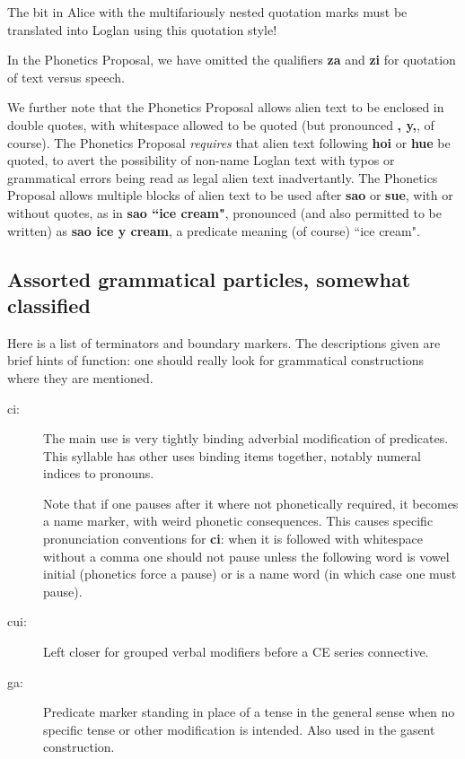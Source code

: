 \documentclass[12pt]{book}
\begin{document}
{The bit in Alice with the multifariously nested quotation marks must be translated into Loglan using this quotation style!

In the Phonetics Proposal, we have omitted the qualifiers {\bf za} and {\bf zi} for quotation of text versus speech.

We further note that the Phonetics Proposal allows alien text to be enclosed in double quotes, with whitespace allowed to be quoted
(but pronounced {\bf, y,}, of course).  The Phonetics Proposal {\em requires\/} that alien text following {\bf hoi} or {\bf hue} be quoted, to avert the possibility of non-name Loglan text with typos or grammatical errors being read as legal alien text inadvertantly.  The Phonetics Proposal allows multiple blocks of alien text to be used after {\bf sao} or {\bf sue}, with or without quotes, as in {\bf sao ``ice cream"}, pronounced (and also permitted to be written)
as {\bf sao ice y cream}, a predicate meaning (of course) ``ice cream".

\subsection{Assorted grammatical particles, somewhat classified}

Here is a list of terminators and boundary markers.  The descriptions given are brief hints of function:  one should really look for grammatical constructions where they are mentioned.

\begin{description}
\item [ci:]  The main use is very tightly binding adverbial modification of predicates.  This syllable has other uses binding items together, notably numeral indices to pronouns.

Note that if one pauses after it where not phonetically required, it becomes a name marker, with weird phonetic consequences.  This causes specific pronunciation conventions for {\bf ci}:  when it is followed with whitespace without a comma one should not pause unless the following word is vowel initial (phonetics force a pause) or is a name word (in which case one must pause).

 \item[cui:]  Left closer for grouped verbal modifiers before a CE series connective.

\item[ga:]   Predicate marker standing in place of a tense in the general sense when no specific tense or other modification is intended.  Also used in the gasent construction.


\end{description}}
\end{document}
